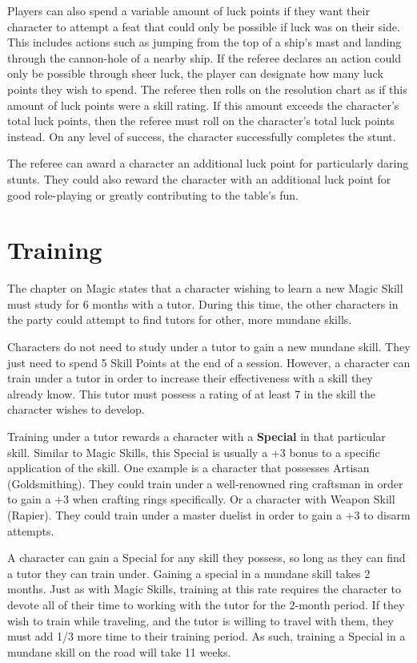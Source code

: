 \documentclass[oneside]{book}
\begin{document}
\begin{multicols}{2}
Players can also spend a variable amount of luck points if they want their character to attempt a feat that could only be possible if luck was on their side. This includes actions such as jumping from the top of a ship's mast and landing through the cannon-hole of a nearby ship. If the referee declares an action could only be possible through sheer luck, the player can designate how many luck points they wish to spend. The referee then rolls on the resolution chart as if this amount of luck points were a skill rating. If this amount exceeds the character's total luck points, then the referee must roll on the character's total luck points instead. On any level of success, the character successfully completes the stunt. 

The referee can award a character an additional luck point for particularly daring stunts. They could also reward the character with an additional luck point for good role-playing or greatly contributing to the table's fun. 

\section{Training}

The chapter on Magic states that a character wishing to learn a new Magic Skill must study for 6 months with a tutor. During this time, the other characters in the party could attempt to find tutors for other, more mundane skills. 

Characters do not need to study under a tutor to gain a new mundane skill. They just need to spend 5 Skill Points at the end of a session. However, a character can train under a tutor in order to increase their effectiveness with a skill they already know. This tutor must possess a rating of at least 7 in the skill the character wishes to develop.

Training under a tutor rewards a character with a \textbf{Special} in that particular skill. Similar to Magic Skills, this Special is usually a +3 bonus to a specific application of the skill. One example is a character that possesses Artisan (Goldsmithing). They could train under a well-renowned ring craftsman in order to gain a +3 when crafting rings specifically. Or a character with Weapon Skill (Rapier). They could train under a master duelist in order to gain a +3 to disarm attempts. 

A character can gain a Special for any skill they possess, so long as they can find a tutor they can train under. Gaining a special in a mundane skill takes 2 months. Just as with Magic Skills, training at this rate requires the character to devote all of their time to working with the tutor for the 2-month period. If they wish to train while traveling, and the tutor is willing to travel with them, they must add 1/3 more time to their training period. As such, training a Special in a mundane skill on the road will take 11 weeks. 


\end{multicols}
\end{document}
